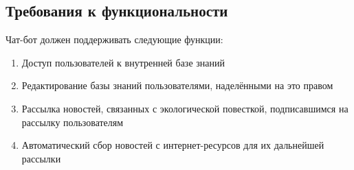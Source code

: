 \subsection{Требования к функциональности}
\label{sec:req:fn}
Чат-бот должен поддерживать следующие функции:
\begin{enumerate}
    \item
        Доступ пользователей к внутренней базе знаний
    \item
        Редактирование базы знаний пользователями, наделёнными на это правом
    \item
        Рассылка новостей, связанных с экологической повесткой, подписавшимся на рассылку
        пользователям
    \item
        Автоматический сбор новостей с интернет-ресурсов для их дальнейшей рассылки
\end{enumerate}

